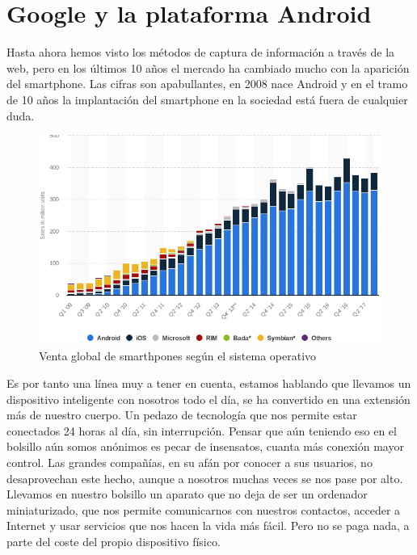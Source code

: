 \documentclass[12pt,a4paper,oneside]{book} %
\begin{document}
\section{Google y la plataforma Android}
Hasta ahora hemos visto los métodos de captura de información a través de la web, pero en los últimos 10 años el mercado ha cambiado mucho con la aparición del smartphone. Las cifras son apabullantes, en 2008 nace Android y en el tramo de 10 años la implantación del smartphone en la sociedad está fuera de cualquier duda. 
\begin{figure}[H]
	\begin{center}
   		\includegraphics[scale=0.5]{pictures/data/smartphone_sells.png}
	    	\caption{Venta global de smarthpones según el sistema operativo}
   		\label{fig:Venta de Smartphones}
	\end{center}
\end{figure}
Es por tanto una línea muy a tener en cuenta, estamos hablando que llevamos un dispositivo inteligente con nosotros todo el día, se ha convertido en una extensión más de nuestro cuerpo. Un pedazo de tecnología que nos permite estar conectados 24 horas al día, sin interrupción. 
\newline \newline
Pensar que aún teniendo eso en el bolsillo aún somos anónimos es pecar de insensatos, cuanta más conexión mayor control. Las grandes compañías, en su afán por conocer a sus usuarios, no desaprovechan este hecho, aunque a nosotros muchas veces se nos pase por alto. Llevamos en nuestro bolsillo un aparato que no deja de ser un ordenador miniaturizado, que nos permite comunicarnos con nuestros contactos, acceder a Internet y usar servicios que nos hacen la vida más fácil. Pero no se paga nada, a parte del coste del propio dispositivo físico. 
\end{document}
